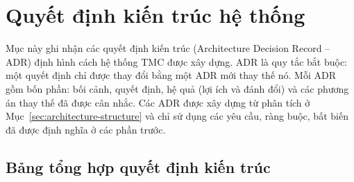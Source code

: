 \section{Quyết định kiến trúc hệ thống}\label{sec:architecture-decisions}
Mục này ghi nhận các quyết định kiến trúc (Architecture Decision Record -- ADR) định hình cách hệ thống TMC được xây dựng. ADR là quy tắc bắt buộc: một quyết định chỉ được thay đổi bằng một ADR mới thay thế nó. Mỗi ADR gồm bốn phần: bối cảnh, quyết định, hệ quả (lợi ích và đánh đổi) và các phương án thay thế đã được cân nhắc. Các ADR được xây dựng từ phân tích ở Mục~\ref{sec:architecture-structure} và chỉ sử dụng các yêu cầu, ràng buộc, bất biến đã được định nghĩa ở các phần trước.

\subsection{Bảng tổng hợp quyết định kiến trúc}\label{sec:adr-summary}

